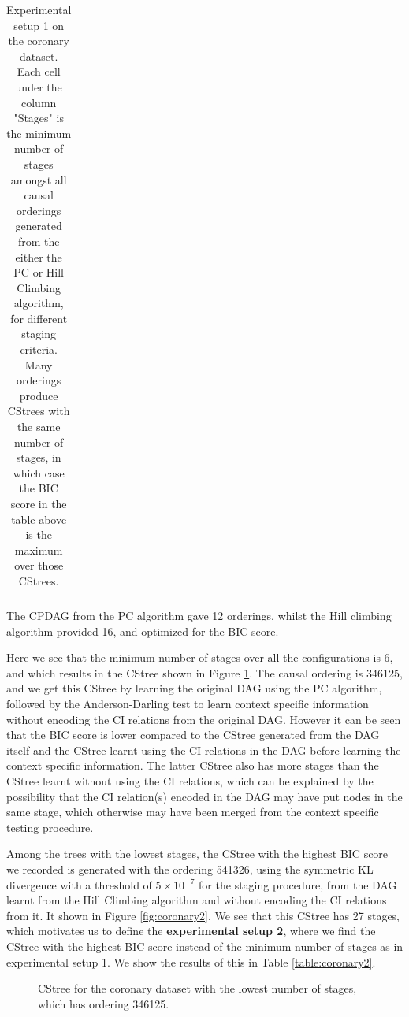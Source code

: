 \documentclass{tufte-book}
\begin{document}
\begin{table}[]
\begin{tabular}{cccccccccccccccc}
\caption{Experimental setup 1 on the coronary dataset. Each cell under the column "Stages" is the minimum number of stages amongst all causal orderings generated from the either the PC or Hill Climbing algorithm, for different staging criteria. Many orderings produce CStrees with the same number of stages, in which case the BIC score in the table above is the maximum over those CStrees.}
\end{tabular}
\end{table}

The CPDAG from the PC algorithm gave 12 orderings, whilst the Hill climbing algorithm provided 16, and optimized for the BIC score.


Here we see that the minimum number of stages over all the configurations is 6, and which results in the CStree shown in Figure \ref{fig:coronary1}. The causal ordering is 346125, and we get this CStree by learning the original DAG using the PC algorithm, followed by the Anderson-Darling test to learn context specific information without encoding the CI relations from the original DAG. However it can be seen that the BIC score is lower compared to the CStree generated from the DAG itself and the CStree learnt using the CI relations in the DAG before learning the context specific information. The latter CStree also has more stages than the CStree learnt without using the CI relations, which can be explained by the possibility that the CI relation(s) encoded in the DAG may have put nodes in the same stage, which otherwise may have been merged from the context specific testing procedure.


Among the trees with the lowest stages, the CStree with the highest BIC score we recorded is generated with the ordering 541326, using the symmetric KL divergence with a threshold of \(5\times 10^{-7}\) for the staging procedure, from the DAG learnt from the Hill Climbing algorithm and without encoding the CI relations from it. It shown in Figure \ref{fig:coronary2}. We see that this CStree has 27 stages, which motivates us to define the \textbf{experimental setup 2}, where we find the CStree with the highest BIC score instead of the minimum number of stages as in experimental setup 1. We show the results of this in Table \ref{table:coronary2}.

\begin{figure}[]\label{fig:coronary1}
   \begin{floatrow}
%
\caption{CStree for the coronary dataset with the lowest number of stages, which has ordering 346125.}
        
   \end{floatrow}
\end{figure}
\end{document}
